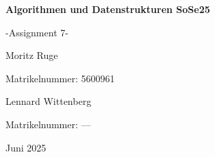 \begin{titlepage}
    \centering
    \vspace*{3cm}
    {\Huge\bfseries Algorithmen und Datenstrukturen SoSe25 \par}
    \vspace{0.5cm}
    {\Huge -Assignment 7- \par}
    \vspace{1cm}
    {\Large Moritz Ruge \par}
    \vspace{0.1cm}
    {\small Matrikelnummer: 5600961 \par}
    {\Large Lennard Wittenberg \par}
    \vspace{0.1cm}
    {\small Matrikelnummer: ---\par}
    \vfill
    {\large Juni 2025}
\end{titlepage}